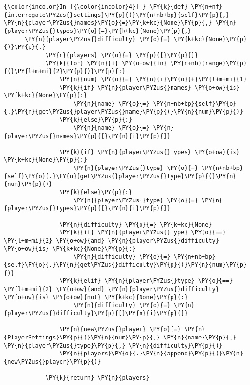     \begin{Verbatim}[commandchars=\\\{\}]
{\color{incolor}In [{\color{incolor}4}]:} \PY{k}{def} \PY{n+nf}{interrogate\PYZus{}settings}\PY{p}{(}\PY{n+nb+bp}{self}\PY{p}{,} \PY{n}{player\PYZus{}names}\PY{o}{=}\PY{k+kc}{None}\PY{p}{,} \PY{n}{player\PYZus{}types}\PY{o}{=}\PY{k+kc}{None}\PY{p}{,} 
	  \PY{n}{player\PYZus{}difficulty} \PY{o}{=} \PY{k+kc}{None}\PY{p}{)}\PY{p}{:}
            \PY{n}{players} \PY{o}{=} \PY{p}{[}\PY{p}{]}
            \PY{k}{for} \PY{n}{i} \PY{o+ow}{in} \PY{n+nb}{range}\PY{p}{(}\PY{l+m+mi}{2}\PY{p}{)}\PY{p}{:}
                \PY{n}{num} \PY{o}{=} \PY{n}{i}\PY{o}{+}\PY{l+m+mi}{1}
                \PY{k}{if} \PY{n}{player\PYZus{}names} \PY{o+ow}{is} \PY{k+kc}{None}\PY{p}{:}
                    \PY{n}{name} \PY{o}{=} \PY{n+nb+bp}{self}\PY{o}{.}\PY{n}{get\PYZus{}player\PYZus{}name}\PY{p}{(}\PY{n}{num}\PY{p}{)}
                \PY{k}{else}\PY{p}{:}
                    \PY{n}{name} \PY{o}{=} \PY{n}{player\PYZus{}names}\PY{p}{[}\PY{n}{i}\PY{p}{]}
        
                \PY{k}{if} \PY{n}{player\PYZus{}types} \PY{o+ow}{is} \PY{k+kc}{None}\PY{p}{:}
                    \PY{n}{player\PYZus{}type} \PY{o}{=} \PY{n+nb+bp}{self}\PY{o}{.}\PY{n}{get\PYZus{}player\PYZus{}type}\PY{p}{(}\PY{n}{num}\PY{p}{)}
                \PY{k}{else}\PY{p}{:}
                    \PY{n}{player\PYZus{}type} \PY{o}{=} \PY{n}{player\PYZus{}types}\PY{p}{[}\PY{n}{i}\PY{p}{]}
        
                \PY{n}{difficulty} \PY{o}{=} \PY{k+kc}{None}
                \PY{k}{if} \PY{n}{player\PYZus{}type} \PY{o}{==} \PY{l+m+mi}{2} \PY{o+ow}{and} \PY{n}{player\PYZus{}difficulty} \PY{o+ow}{is} \PY{k+kc}{None}\PY{p}{:}
                    \PY{n}{difficulty} \PY{o}{=} \PY{n+nb+bp}{self}\PY{o}{.}\PY{n}{get\PYZus{}difficulty}\PY{p}{(}\PY{n}{num}\PY{p}{)}
                \PY{k}{elif} \PY{n}{player\PYZus{}type} \PY{o}{==} \PY{l+m+mi}{2} \PY{o+ow}{and} \PY{n}{player\PYZus{}difficulty} \PY{o+ow}{is} \PY{o+ow}{not} \PY{k+kc}{None}\PY{p}{:}
                    \PY{n}{difficulty} \PY{o}{=} \PY{n}{player\PYZus{}difficulty}\PY{p}{[}\PY{n}{i}\PY{p}{]}
        
                \PY{n}{new\PYZus{}player} \PY{o}{=} \PY{n}{PlayerSettings}\PY{p}{(}\PY{n}{num}\PY{p}{,} \PY{n}{name}\PY{p}{,} \PY{n}{player\PYZus{}type}\PY{p}{,} \PY{n}{difficulty}\PY{p}{)}
                \PY{n}{players}\PY{o}{.}\PY{n}{append}\PY{p}{(}\PY{n}{new\PYZus{}player}\PY{p}{)}
        
            \PY{k}{return} \PY{n}{players}
\end{Verbatim}


